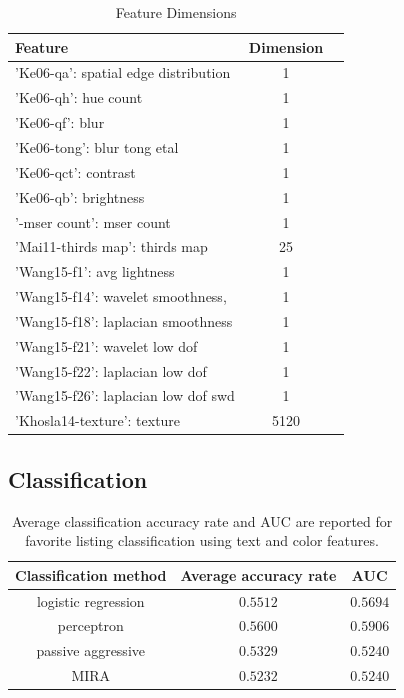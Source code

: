\documentclass[conference,a4paper]{IEEEtran}
\begin{document}
\begin{table}
\begin{center}
\begin{tabular}{| l | c | c |}
\hline
Feature & Dimension \\ \hline
'Ke06-qa': spatial edge distribution & 1 \\ \hline
'Ke06-qh': hue count & 1 \\ \hline
'Ke06-qf': blur & 1 \\ \hline
'Ke06-tong': blur tong etal & 1 \\ \hline
'Ke06-qct': contrast & 1 \\ \hline
'Ke06-qb': brightness & 1 \\ \hline
'-mser count': mser count & 1 \\ \hline
'Mai11-thirds map': thirds map & 25 \\ \hline
'Wang15-f1': avg lightness & 1 \\ \hline
'Wang15-f14': wavelet smoothness, & 1 \\ \hline
'Wang15-f18': laplacian smoothness & 1 \\ \hline
'Wang15-f21': wavelet low dof & 1 \\ \hline
'Wang15-f22': laplacian low dof & 1 \\ \hline
'Wang15-f26': laplacian low dof swd & 1 \\ \hline
'Khosla14-texture': texture & 5120 \\ \hline
\hline
\end{tabular}
\end{center}
\caption{Feature Dimensions}
\end{table}

\subsection{Classification}
\label{sec:classification}
\begin{table}[h!]
   \label{tab:classification accuracy}
    \begin{center}
\begin{tabular}{|c||c|c|} 
\hline
Classification method&Average accuracy rate& AUC\\
\hline
 \hline
logistic regression& $0.5512$ & $0.5694$\\ \hline
perceptron&$\mathbf{0.5600}$&$\mathbf{0.5906}$\\ \hline
passive aggressive&$0.5329$& $0.5240$\\ \hline
MIRA&$0.5232$&$0.5240$\\ \hline
 \hline
 \end{tabular}
   \end{center}
\caption{Average classification accuracy rate and AUC are reported
     for favorite listing classification using text and color
     features.}
  \label{tab:classification accuracy}
\end{table}
\end{document}
